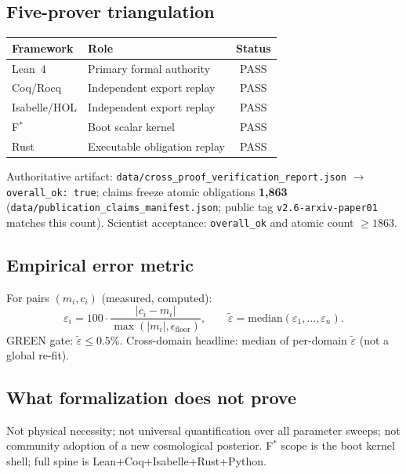 \documentclass[11pt,a4paper]{article}
\begin{document}
\subsection{Five-prover triangulation}

\begin{center}
\begin{tabular}{@{}llc@{}}
\toprule
Framework & Role & Status \\
\midrule
Lean~4 & Primary formal authority & PASS \\
Coq/Rocq & Independent export replay & PASS \\
Isabelle/HOL & Independent export replay & PASS \\
F$^*$ & Boot scalar kernel & PASS \\
Rust & Executable obligation replay & PASS \\
\bottomrule
\end{tabular}
\end{center}

Authoritative artifact:
\texttt{data/cross\_proof\_verification\_report.json}
$\to$ \texttt{overall\_ok: true};
claims freeze atomic obligations \textbf{1{,}863}
(\texttt{data/publication\_claims\_manifest.json};
public tag \texttt{v2.6-arxiv-paper01} matches this count).
Scientist acceptance: \texttt{overall\_ok} and atomic count $\ge 1863$.

\subsection{Empirical error metric}

For pairs $(m_i,c_i)$ (measured, computed):
\begin{equation}
\varepsilon_i = 100\cdot\frac{|c_i-m_i|}{\max(|m_i|,\epsilon_{\mathrm{floor}})},
\qquad
\tilde{\varepsilon}=\mathrm{median}(\varepsilon_1,\ldots,\varepsilon_n).
\end{equation}
GREEN gate: $\tilde{\varepsilon}\le 0.5\%$.
Cross-domain headline: median of per-domain $\tilde{\varepsilon}$
(not a global re-fit).

\subsection{What formalization does not prove}

Not physical necessity; not universal quantification over all parameter sweeps;
not community adoption of a new cosmological posterior.
F$^*$ scope is the boot kernel shell; full spine is
Lean+Coq+Isabelle+Rust+Python.
\end{document}
